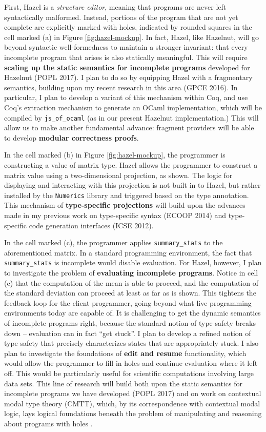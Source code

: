 \documentclass[9pt]{extarticle}
\let\li\lstinline
\begin{document}
First, Hazel is a \emph{structure editor}, meaning that programs are never left syntactically malformed. Instead, portions of the program that are not yet complete are explicitly marked with holes, indicated by rounded squares in the cell marked (a) in Figure \ref{fig:hazel-mockup}. In fact, Hazel, like Hazelnut, will go beyond syntactic well-formedness to maintain a stronger invariant: that every incomplete program that arises is also statically meaningful. This will require \textbf{scaling up the static semantics for incomplete programs} developed for Hazelnut (POPL 2017). I plan to do so by equipping Hazel with a fragmentary semantics, building upon my recent research in this area (GPCE 2016). In particular, I plan to develop a variant of this mechanism within Coq, and use Coq's extraction mechanism to generate an OCaml implementation, which will be compiled by \li{js_of_ocaml} (as in our present Hazelnut implementation.) This will allow us to make another fundamental advance: fragment providers will be able to develop \textbf{modular correctness proofs}.

In the cell marked (b) in Figure \ref{fig:hazel-mockup}, the programmer is constructing a value of matrix type. Hazel allows the programmer to construct a matrix value using a {two-dimensional projection}, as shown. The logic for displaying and interacting with this projection is not built in to Hazel, but rather installed by the \li{Numerics} library and triggered based on the type annotation. This mechanism of \textbf{type-specific projections} will build upon the advances made in my previous work on type-specific syntax (ECOOP 2014) and type-specific code generation interfaces (ICSE 2012).%

In the cell marked (c), the programmer applies \li{summary_stats} to the aforementioned matrix. In a standard programming environment, the fact that \li{summary_stats} is incomplete would disable evaluation. For Hazel, however, I plan to investigate the problem of \textbf{evaluating incomplete programs}. Notice in cell (c) that the computation of the mean is able to proceed, and the computation of the standard deviation can proceed at least as far as is shown. This tightens the feedback loop for the client programmer, going beyond what live programming environments today are capable of. It is challenging to get the dynamic semantics of incomplete programs right, because the standard notion of type safety breaks down -- evaluation can in fact ``get stuck''. I plan to develop a refined notion of type safety that precisely characterizes states that are appropriately stuck. I also plan to investigate the foundations of \textbf{edit and resume} functionality, which would allow the programmer to fill in holes and continue evaluation where it left off. This would be particularly useful for scientific computations involving large data sets. This line of research will build both upon the static semantics for incomplete programs we have developed (POPL 2017) and on work on contextual modal type theory (CMTT), which, by its correspondence with contextual modal logic, lays logical foundations beneath the problem of manipulating and reasoning about programs with holes \cite{Nanevski2008}.
\end{document}
